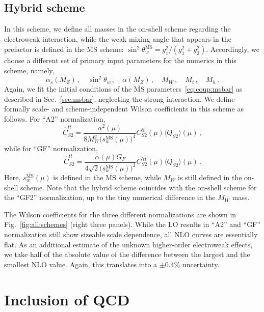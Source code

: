 \documentclass[letter,11pt,DIV=12,abstract=true,numbers=noenddot,titlepage=false,twocolumn=false,draft=false]{scrartcl}
\newcommand{\MS}{$\overline{\text{MS}}$}
\begin{document}
\subsection{Hybrid scheme}

In this scheme, we define all masses in the on-shell scheme regarding
the electroweak interaction, while the weak mixing angle that appears
in the prefactor is defined in the \MS{} scheme:
$\sin^2\theta_w^{\overline{\text{MS}}} = g_1^2 / (g_1^2 +
g_2^2)$. Accordingly, we choose a different set of primary input
parameters for the numerics in this scheme, namely,
\begin{equation}
  \alpha_s(M_Z)\,, \quad \sin^2\theta_w\,, \quad \alpha(M_Z)\,, \quad M_W\,, \quad M_t\,, \quad M_h\,.
\end{equation}
Again, we fit the initial conditions of the \MS{}
parameters~\eqref{eq:coup:msbar} as described in Sec.~\ref{sec:msbar},
neglecting the strong interaction. We define formally scale- and
scheme-independent Wilson coefficients in this scheme as follows. For
``A2'' normalization,
\begin{equation}
  \hat C_{S2}^{tt} =
  \frac{\alpha^2(\mu)}{8 M_W^2 \big(s_w^{\overline{\text{MS}}}(\mu)\big)^4}
  C_{S2}^{tt}(\mu) \langle Q_{S2}\rangle (\mu) \,,
\end{equation}
while for ``GF'' normalization,
\begin{equation}
  \hat C_{S2}^{tt} =
  \frac{\alpha(\mu) G_F}{4\sqrt{2} \big(s_w^{\overline{\text{MS}}}(\mu)\big)^2}
  C_{S2}^{\prime tt}(\mu) \langle Q_{S2}\rangle (\mu) \,.
\end{equation}
Here, $s_w^{\overline{\text{MS}}}(\mu)$ is defined in the \MS{}
scheme, while $M_W$ is still defined in the on-shell scheme. Note that
the hybrid scheme coincides with the on-shell scheme for the ``GF2''
normalization, up to the tiny numerical difference in the $M_W$ mass.

The Wilson coefficients for the three different normalizations are
shown in Fig.~\ref{fig:all:schemes} (right three panels). While the LO
results in ``A2'' and ``GF'' normalization still show sizeable scale
dependence, all NLO curves are essentially flat. As an additional
estimate of the unknown higher-order electroweak effects, we take half
of the absolute value of the difference between the largest and the
smallest NLO value. Again, this translates into a $\pm 0.4\%$
uncertainty.


\section{Inclusion of QCD}\label{sec:qcd}
\end{document}
